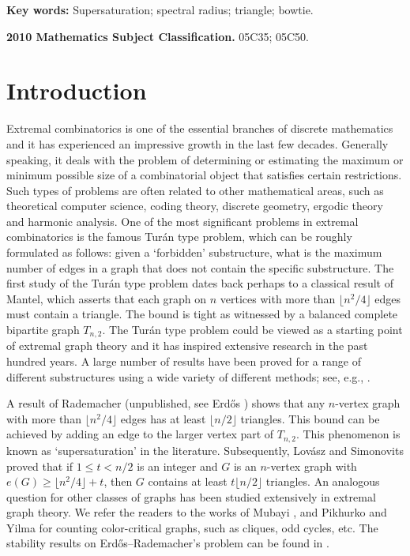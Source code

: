\documentclass[11pt]{article}
\begin{document}
{{\bf Key words:} Supersaturation; spectral  radius; triangle; bowtie. }

{{\bf 2010 Mathematics Subject Classification.}  05C35; 05C50.}




\section{Introduction} 
Extremal combinatorics is one of the essential branches of 
discrete mathematics and it has experienced an impressive growth 
in the last few decades. 
Generally speaking, it deals with the problem of determining or estimating the maximum or minimum possible size of a combinatorial object that satisfies certain restrictions.  
Such types of problems are often related to other mathematical areas, such as  theoretical computer science, coding theory, 
discrete geometry, 
ergodic theory and harmonic analysis. 
One of the most significant problems in extremal combinatorics  is the famous Tur\'{a}n type problem, 
which can be roughly formulated as follows: 
given a `forbidden' substructure, 
what is the maximum number of edges in a graph 
that does not contain the specific substructure.  
The first study of the Tur\'{a}n type problem dates back perhaps to a classical result of Mantel, 
which asserts that each graph on $n$ vertices 
with more than $\lfloor n^2/4\rfloor $ edges must contain a triangle. 
The bound is tight as witnessed by 
a balanced complete bipartite graph $T_{n,2}$. 
The Tur\'{a}n type problem could be viewed as 
 a starting point of extremal graph 
theory and it has inspired extensive research in the past hundred years. 
A large number of results have  
been proved for a range of different substructures using a wide variety of different methods; 
see, e.g., \cite{Bollobas78}. 

\medskip 
A result of Rademacher (unpublished, see Erd\H{o}s \cite{Erd1955,Erdos1964}) shows that 
any $n$-vertex graph with more than $\lfloor n^2/4\rfloor $ edges has at least $\lfloor n/2\rfloor$ triangles. 
 This bound can be achieved 
 by adding an edge to the larger vertex part of $T_{n,2}$. 
 This phenomenon is known as `supersaturation' in the literature.  
Subsequently, 
Lov\'{a}sz and Simonovits \cite{LS1975,LS1983}  proved that 
if $1\le t <{n}/{2}$ is an integer and $G$ is an $n$-vertex graph with
$e(G)\ge \lfloor {n^2}/{4} \rfloor + t$,  
then $G$ contains at least $t \lfloor {n}/{2}\rfloor $
triangles.   
An analogous question for other classes of graphs 
has been studied extensively in extremal graph theory.  
We refer the readers to 
the works of Mubayi \cite{Mub2010}, and 
Pikhurko and Yilma \cite{PY2017} 
for counting color-critical graphs, 
such as cliques, odd cycles, etc. 
The stability results on Erd\H{o}s--Rademacher's problem 
can be found in \cite{XK2021,LM2022-Erd-Rad,BC2023}. 
\end{document}
